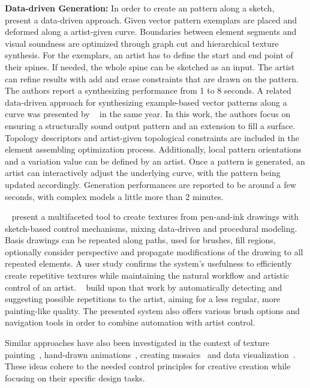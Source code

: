 \textbf{Data-driven Generation:}\label{subsubpara:analysis_rulebased_sketchbased_datadriven}
In order to create an pattern along a sketch, \citeauthor*{lu_2014_dds}~\cite{lu_2014_dds} present a data-driven approach. Given vector pattern exemplars are placed and deformed along a artist-given curve. Boundaries between element segments and visual soundness are optimized through graph cut and hierarchical texture synthesis. For the exemplars, an artist has to define the start and end point of their spines. If needed, the whole spine can be sketched as an input. The artist can refine results with add and erase constraints that are drawn on the pattern. The authors report a synthesizing performance from 1 to 8 seconds. A related data-driven approach for synthesizing example-based vector patterns along a curve was presented by \citeauthor*{zhou_2014_tsv}~\cite{zhou_2014_tsv} in the same year. In this work, the authors focus on ensuring a structurally sound output pattern and an extension to fill a surface. Topology descriptors and artist-given topological constraints are included in the element assembling optimization process. Additionally, local pattern orientations and a variation value can be defined by an artist. Once a pattern is generated, an artist can interactively adjust the underlying curve, with the pattern being updated accordingly. Generation performances are reported to be around a few seconds, with complex models a little more than 2 minutes.

\citeauthor*{kazi_2012_vit}~\cite{kazi_2012_vit} present a multifaceted tool to create textures from pen-and-ink drawings with sketch-based control mechanisms, mixing data-driven and procedural modeling. Basis drawings can be repeated along paths, used for brushes, fill regions, optionally consider perspective and propagate modifications of the drawing to all repeated elements. A user study confirms the system's usefulness to efficiently create repetitive textures while maintaining the natural workflow and artistic control of an artist. \citeauthor*{xing_2014_apr}~\cite{xing_2014_apr} build upon that work by automatically detecting and suggesting possible repetitions to the artist, aiming for a less regular, more painting-like quality. The presented system also offers various brush options and navigation tools in order to combine automation with artist control.

Similar approaches have also been investigated in the context of texture painting~\cite{lukac_2013_pft}, hand-drawn animations~\cite{xing_2015_aha}, creating mosaics~\cite{igarashi_2010_dde,abdrashitov_2014_msi} and data visualization~\cite{xia_2018_ddc}. These ideas cohere to the needed control principles for creative creation while focusing on their specific design tasks. 

